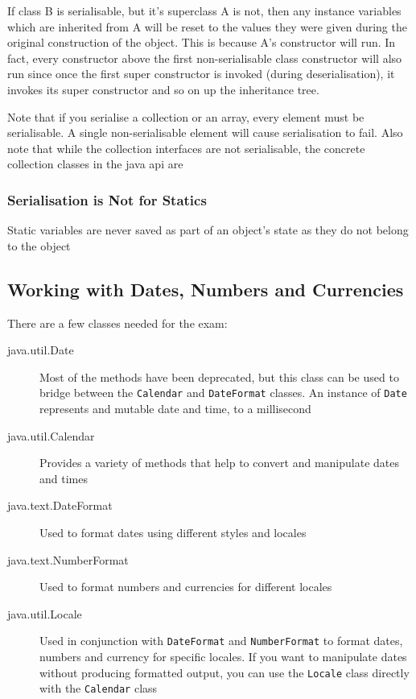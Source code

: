 If class B is serialisable, but it's superclass A is not, then any instance 
variables which are inherited from A will be reset to the values they were 
given during the original construction of the object. This is because A's 
constructor will run. In fact, every constructor above the first 
non-serialisable class constructor will also run since once the first super 
constructor is invoked (during deserialisation), it invokes its super 
constructor and so on up the inheritance tree.

Note that if you serialise a collection or an array, every element must be 
serialisable. A single non-serialisable element will cause serialisation to 
fail. Also note that while the collection interfaces are not serialisable, the 
concrete collection classes in the java api are

\subsubsection{Serialisation is Not for Statics}
Static variables are never saved as part of an object's state as they do not 
belong to the object

\subsection{Working with Dates, Numbers and Currencies}
There are a few classes needed for the exam:
\begin{description}
    \item[java.util.Date] Most of the methods have been deprecated, but this 
    class can be used to bridge between the \verb#Calendar# and 
    \verb#DateFormat# classes. An instance of \verb#Date# represents and mutable
    date and time, to a millisecond
    \item[java.util.Calendar] Provides a variety of methods that help to 
    convert and manipulate dates and times
    \item[java.text.DateFormat] Used to format dates using different styles and 
    locales
    \item[java.text.NumberFormat] Used to format numbers and currencies for 
    different locales
    \item[java.util.Locale] Used in conjunction with \verb#DateFormat# and 
    \verb#NumberFormat# to format dates, numbers and currency for specific 
    locales. If you want to manipulate dates without producing formatted 
    output, you can use the \verb#Locale# class directly with the 
    \verb#Calendar# class
\end{description}

